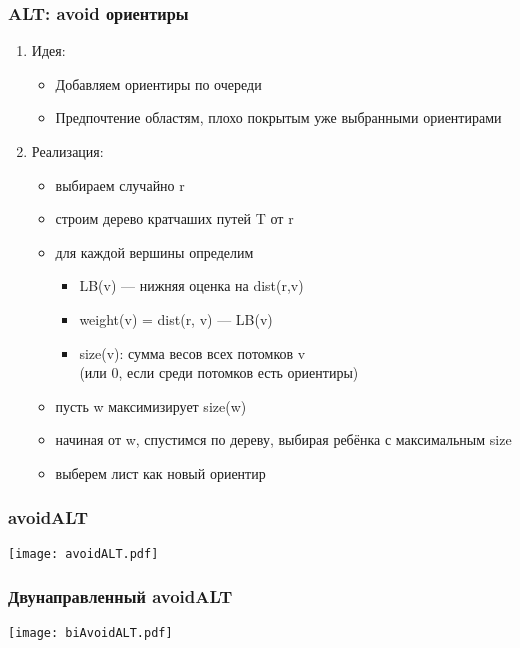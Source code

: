 \documentclass{beamer}
\begin{document}
\begin{frame}
\frametitle{ALT: avoid ориентиры}
\begin{enumerate}	
\item Идея:

	\begin{itemize}
    \item Добавляем ориентиры по очереди
    \item Предпочтение областям, плохо покрытым уже выбранными ориентирами
    \end{itemize}
    
\item Реализация:

	\begin{itemize}
    \item выбираем случайно r
    \item строим дерево кратчаших путей T от r
    \item для каждой вершины определим
      \begin{itemize}
      \item LB(v) --- нижняя оценка на dist(r,v)
      \item weight(v) = dist(r, v) --- LB(v)
      \item size(v): сумма весов всех потомков v\\ (или 0, если среди потомков есть ориентиры)
      \end{itemize}
    \item пусть w максимизирует size(w)
    \item начиная от w, спустимся по дереву, выбирая ребёнка с максимальным size
    \item выберем лист как новый ориентир
    \end{itemize}
    
\end{enumerate}

\end{frame}



\begin{frame}
\frametitle{avoidALT}
\texttt{[image: avoidALT.pdf]}
\end{frame}


\begin{frame}
\frametitle{Двунаправленный avoidALT}
\texttt{[image: biAvoidALT.pdf]}
\end{frame}
\end{document}
